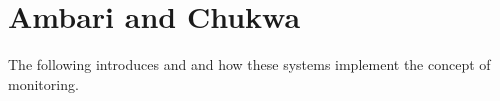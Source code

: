 \section{Ambari and Chukwa}

The following introduces \amb and \chuk and how these systems implement the concept of monitoring.



